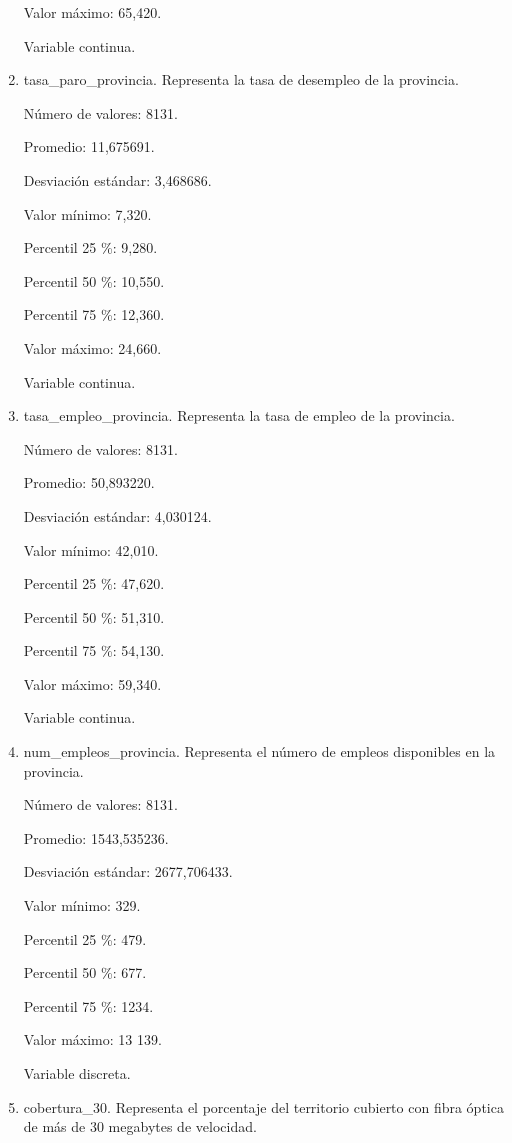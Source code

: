 \begin{enumerate}
	Valor máximo: 65,420.
	
	Variable continua.

	\item tasa\_paro\_provincia. Representa la tasa de desempleo de la provincia.
	
	Número de valores: 8131.
	
	Promedio: 11,675691.
	
	Desviación estándar: 3,468686.
	
	Valor mínimo: 7,320.
	
	Percentil 25 \%: 9,280.
	
	Percentil 50 \%: 10,550.
	
	Percentil 75 \%: 12,360.
	
	Valor máximo: 24,660.
	
	Variable continua.

	\item tasa\_empleo\_provincia. Representa la tasa de empleo de la provincia.
	
	Número de valores: 8131.
	
	Promedio: 50,893220.
	
	Desviación estándar: 4,030124.
	
	Valor mínimo: 42,010.
	
	Percentil 25 \%: 47,620.
	
	Percentil 50 \%: 51,310.
	
	Percentil 75 \%: 54,130.
	
	Valor máximo: 59,340.
	
	Variable continua.

	\item num\_empleos\_provincia. Representa el número de empleos disponibles en la provincia.
	
	Número de valores: 8131.
	
	Promedio: 1543,535236.
	
	Desviación estándar: 2677,706433.
	
	Valor mínimo: 329.
	
	Percentil 25 \%: 479.
	
	Percentil 50 \%: 677.
	
	Percentil 75 \%: 1234.
	
	Valor máximo: 13 139.
	
	Variable discreta.

	\item cobertura\_30. Representa el porcentaje del territorio cubierto con fibra óptica de más de 30 megabytes de velocidad.
	

\end{enumerate}
